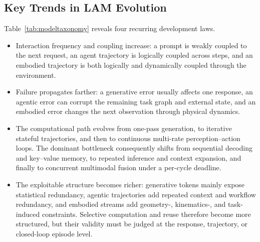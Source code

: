 \documentclass[letterpaper,journal]{IEEEtran}
\begin{document}
\subsection{Key Trends in LAM Evolution}
Table~\ref{tab:modeltaxonomy} reveals four recurring development laws. 
\begin{itemize}
    \item Interaction frequency and coupling increase: a prompt is weakly coupled to the next request, an agent trajectory is logically coupled across steps, and an embodied trajectory is both logically and dynamically coupled through the environment.
    \item Failure propagates farther: a generative error usually affects one response, an agentic error can corrupt the remaining task graph and external state, and an embodied error changes the next observation through physical dynamics.
    \item The computational path evolves from one-pass generation, to iterative stateful trajectories, and then to continuous multi-rate perception--action loops. The dominant bottleneck consequently shifts from sequential decoding and key--value memory, to repeated inference and context expansion, and finally to concurrent multimodal fusion under a per-cycle deadline.
    \item The exploitable structure becomes richer: generative tokens mainly expose statistical redundancy, agentic trajectories add repeated context and workflow redundancy, and embodied streams add geometry-, kinematics-, and task-induced constraints. Selective computation and reuse therefore become more structured, but their validity must be judged at the response, trajectory, or closed-loop episode level.
\end{itemize}

\end{document}
